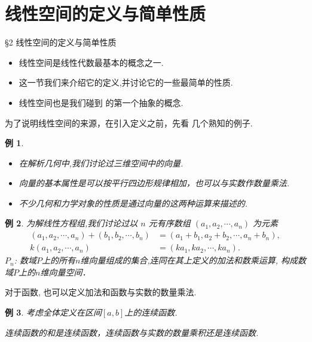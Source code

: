 \documentclass[13pt]{beamer}
\newtheorem{exa}{例}
\begin{document}
\section{线性空间的定义与简单性质}
\begin{frame}{\S 2 线性空间的定义与简单性质}
\begin{itemize}
	\item 线性空间是线性代数最基本的概念之一.
	\item 这一节我们来介绍它的\alert{定义},并讨论它的一些最简单的\alert{性质}.
	\item 线性空间也是我们碰到 的第一个抽象的概念.
\end{itemize}

为了说明线性空间的来源，在引入定义之前，先看 几个熟知的\alert{例子}.  
\begin{exa}
\begin{itemize}
	\item 在解析几何中,我们讨论过三维空间中的向量. 
	\item 向量的基本属性是可以按平行四边形规律相加，也可以与实数作数量乘法.
	\item 不少几何和力学对象的性质是通过向量的这两种运算来描述的.  
\end{itemize}


\end{exa}

\end{frame}


\begin{frame}

\begin{exa}
为解线性方程组,我们讨论过以 $n$ 元有序数组 $\left(a_{1},a_{2}, \cdots, a_{n}\right)$ 为元素
\begin{align*}
\left(a_{1}, a_{2}, \cdots, a_{n}\right)+\left(b_{1}, b_{2}, \cdots, b_{n}\right) 
& =\left(a_{1}+b_{1}, a_{2}+b_{2}, \cdots, a_{n}+b_{n}\right), \\
k\left(a_{1}, a_{2}, \cdots, a_{n}\right) & =\left(k a_{1}, k a_{2}, \cdots, k a_{n}\right).
\end{align*}
$P_n$: 数域$P$上的所有$n$维向量组成的集合,连同在其上定义的加法和数乘运算, 构成数域$P$上的$n$维向量空间．
\end{exa}


对于函数, 也可以定义加法和函数与实数的数量乘法.  

\begin{exa}
考虑全体定义在区间$[a,b]$上的连续函数.

连续函数的和是连续函数，连续函数与实数的数量乘积还是连续函数. 
\end{exa}

%
%
%
%
\end{frame}
\end{document}

